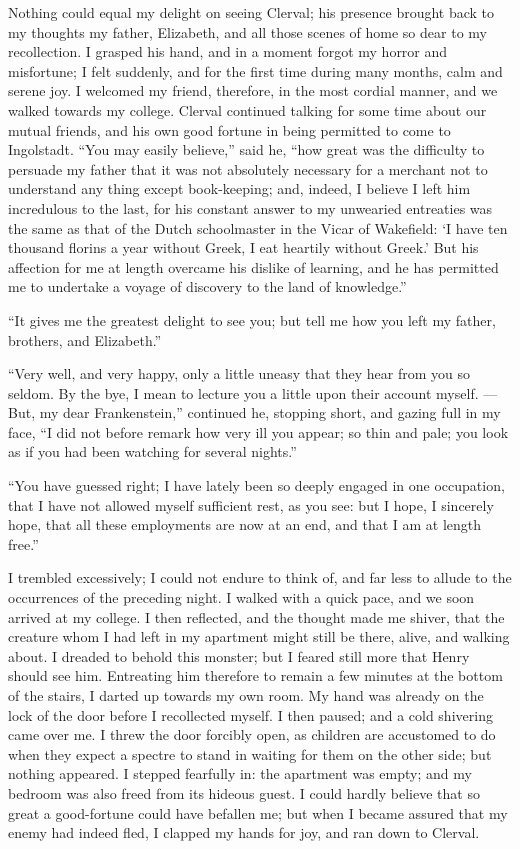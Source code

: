 Nothing could equal my delight on
seeing Clerval; his presence brought
back to my thoughts my father, Elizabeth,
and all those scenes of home so
dear to my recollection. I grasped his
hand, and in a moment forgot my horror
and misfortune; I felt suddenly, and
for the first time during many months,
calm and serene joy. I welcomed my
friend, therefore, in the most cordial
manner, and we walked towards my
college. Clerval continued talking for
some time about our mutual friends,
and his own good fortune in being
permitted to come to Ingolstadt. ``You
may easily believe,'' said he, ``how
great was the difficulty to persuade
my father that it was not absolutely
necessary for a merchant not to understand
any thing except book-keeping;
and, indeed, I believe I left him incredulous
to the last, for his constant answer
to my unwearied entreaties was
the same as that of the Dutch schoolmaster
in the Vicar of Wakefield: `I
have ten thousand florins a year without
Greek, I eat heartily without
Greek.' But his affection for me at
length overcame his dislike of learning,
and he has permitted me to undertake
a voyage of discovery to the land of
knowledge.''

``It gives me the greatest delight
to see you; but tell me how you left
my father, brothers, and Elizabeth.''

``Very well, and very happy, only a
little uneasy that they hear from you
so seldom. By the bye, I mean to lecture
you a little upon their account myself. --- But,
my dear Frankenstein,'' continued
he, stopping short, and gazing
full in my face, ``I did not before remark
how very ill you appear; so thin
and pale; you look as if you had been
watching for several nights.''

``You have guessed right; I have
lately been so deeply engaged in one
occupation, that I have not allowed myself
sufficient rest, as you see: but I
hope, I sincerely hope, that all these
employments are now at an end, and
that I am at length free.''

I trembled excessively; I could not
endure to think of, and far less to allude
to the occurrences of the preceding
night. I walked with a quick pace,
and we soon arrived at my college. I
then reflected, and the thought made
me shiver, that the creature whom I
had left in my apartment might still
be there, alive, and walking about.
I dreaded to behold this monster;
but I feared still more that Henry
should see him. Entreating him therefore
to remain a few minutes at the
bottom of the stairs, I darted up towards
my own room. My hand was
already on the lock of the door before
I recollected myself. I then paused;
and a cold shivering came over me. I
threw the door forcibly open, as children
are accustomed to do when they
expect a spectre to stand in waiting
for them on the other side; but nothing
appeared. I stepped fearfully in: the
apartment was empty; and my bedroom
was also freed from its hideous
guest. I could hardly believe that so
great a good-fortune could have befallen
me; but when I became assured
that my enemy had indeed fled, I clapped
my hands for joy, and ran down to
Clerval.

